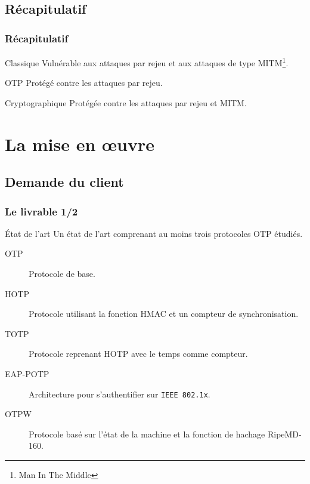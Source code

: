 \documentclass[xcolor=table]{beamer}
\begin{document}
\subsection{Récapitulatif}
\begin{frame}
\frametitle{Récapitulatif}
\begin{block}{Classique}
Vulnérable aux attaques par rejeu et aux attaques de type MITM\footnote{Man In The Middle}.
\end{block}

\begin{block}{OTP}
Protégé contre les attaques par rejeu.
\end{block}

\begin{block}{Cryptographique}
Protégée contre les attaques par rejeu et MITM.
\end{block}

\end{frame}


\section{La mise en œuvre}

\subsection{Demande du client}

\begin{frame}
\frametitle{Le livrable 1/2}
\begin{block}{État de l'art} 
Un état de l'art comprenant au moins trois protocoles OTP étudiés.
\begin{description}
 \item[OTP] Protocole de base.
 \item[HOTP] Protocole utilisant la fonction HMAC et un compteur de 
  synchronisation.
 \item[TOTP] Protocole reprenant HOTP avec le temps comme compteur.
 \item[EAP-POTP] Architecture pour s'authentifier sur \verb?IEEE 802.1x?. 
 \item[OTPW] Protocole basé sur l'état de la machine et la fonction de hachage RipeMD-160.
\end{description}
\end{block}
\end{frame}
\end{document}
